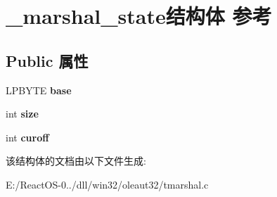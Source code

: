 \hypertarget{struct__marshal__state}{}\section{\+\_\+marshal\+\_\+state结构体 参考}
\label{struct__marshal__state}
\subsection*{Public 属性}
\begin{DoxyCompactItemize}
\item 
\mbox{\label{struct__marshal__state_aee69e7099d709ee9548c48151379dd86}} 
L\+P\+B\+Y\+TE {\bfseries base}
\item 
\mbox{\label{struct__marshal__state_a8298f98e3fc6ec85cff8971eca1b1585}} 
int {\bfseries size}
\item 
\mbox{\label{struct__marshal__state_aada6c50411202824519cb964a0a4f04d}} 
int {\bfseries curoff}
\end{DoxyCompactItemize}


该结构体的文档由以下文件生成\+:\begin{DoxyCompactItemize}
\item 
E\+:/\+React\+O\+S-\/0../dll/win32/oleaut32/tmarshal.\+c\end{DoxyCompactItemize}
